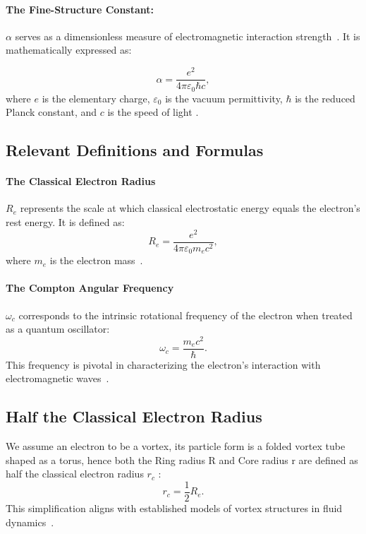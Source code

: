     \paragraph*{The Fine-Structure Constant:}
    $\alpha$ serves as a dimensionless measure of electromagnetic interaction strength~\cite{maxwell1861}.
    It is mathematically expressed as:

    \begin{equation*}
        \alpha = \frac{e^2}{4\pi \varepsilon_0 \hbar c},
    \end{equation*}
    where $e$ is the elementary charge, $\varepsilon_0$ is the vacuum permittivity, $\hbar$ is the reduced Planck constant, and $c$ is the speed of light \cite{dirac1930quantum}.

    \subsection*{Relevant Definitions and Formulas}
    \paragraph*{The Classical Electron Radius}
    $R_e$ represents the scale at which classical electrostatic energy equals the electron's rest energy. It is defined as:
    \begin{equation*}
        R_e = \frac{e^2}{4\pi \varepsilon_0 m_e c^2},
    \end{equation*}
    where $m_e$ is the electron mass~\cite{helmholtz1858}.

    \paragraph*{The Compton Angular Frequency}
    $\omega_c$ corresponds to the intrinsic rotational frequency of the electron when treated as a quantum oscillator:
    \begin{equation*}
        \omega_c = \frac{m_e c^2}{\hbar}.
    \end{equation*}
    This frequency is pivotal in characterizing the electron's interaction with electromagnetic waves~\cite{kelvin1867}.

    \subsection*{Half the Classical Electron Radius}
    We assume an electron to be a vortex, its particle form is a folded vortex tube shaped as a torus, hence both the Ring radius R and Core radius r are defined as half the classical electron radius  $r_c$ :
    \begin{equation*}
        r_c = \frac{1}{2} R_e.
    \end{equation*}
    This simplification aligns with established models of vortex structures in fluid dynamics~\cite{kleckner2013}.

